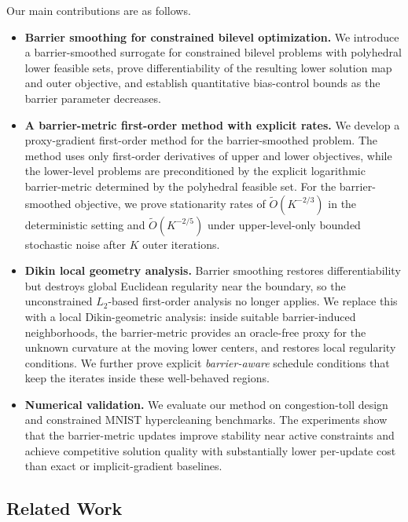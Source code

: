 \documentclass{article}
\begin{document}
Our main contributions are as follows.
\begin{itemize}[leftmargin=*]
    \item \textbf{Barrier smoothing for constrained bilevel optimization.}
    We introduce a barrier-smoothed surrogate for constrained bilevel problems with polyhedral lower feasible sets, prove differentiability of the resulting lower solution map and outer objective, and establish quantitative bias-control bounds as the barrier parameter decreases.
    \item \textbf{A barrier-metric first-order method with explicit rates.}
    We develop a proxy-gradient first-order method for the barrier-smoothed problem. The method uses
    only first-order derivatives of upper and lower objectives, while the lower-level problems are preconditioned by the
    explicit logarithmic barrier-metric determined by the polyhedral feasible set. For the barrier-smoothed objective, we prove stationarity rates of \(\widetilde O(K^{-2/3})\) in the deterministic setting and
    \(\widetilde O(K^{-2/5})\) under upper-level-only bounded stochastic noise after \(K\) outer iterations.
    \item \textbf{Dikin local geometry analysis.}
    Barrier smoothing restores differentiability but destroys global Euclidean regularity near the boundary, so the unconstrained \(L_2\)-based first-order analysis no longer applies. We replace this with a local Dikin-geometric analysis: inside suitable barrier-induced neighborhoods, the barrier-metric provides an oracle-free proxy for the unknown curvature at the moving lower centers, and restores local regularity conditions. We further prove explicit \textit{barrier-aware} schedule conditions that keep the iterates inside these well-behaved regions.
    \item \textbf{Numerical validation.}
    We evaluate our method on congestion-toll design and constrained MNIST hypercleaning
    benchmarks. The experiments show that the barrier-metric updates improve stability near active constraints and achieve competitive solution quality with substantially lower per-update cost than exact or implicit-gradient baselines.
\end{itemize}
\subsection{Related Work}
\end{document}
